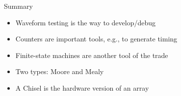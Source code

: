 \begin{frame}[fragile]{Summary}
\begin{itemize}
\item Waveform testing is the way to develop/debug
\item Counters are important tools, e.g., to generate timing
\item Finite-state machines are another tool of the trade
\item Two types: Moore and Mealy
\item A Chisel  is the hardware version of an array
\end{itemize}
\end{frame}




